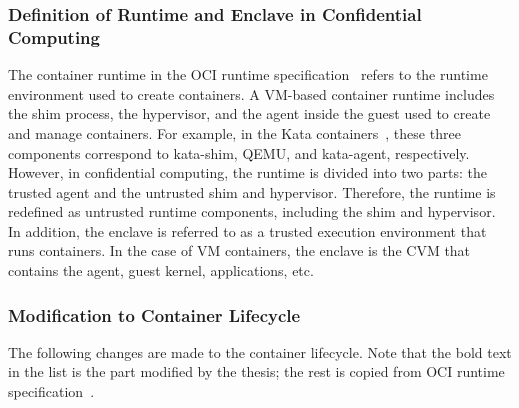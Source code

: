 \subsubsection{Definition of Runtime and Enclave in Confidential Computing}

The container runtime in the OCI runtime specification~\cite*{oci-runtime-spec} refers to the runtime environment used to create containers. A VM-based container runtime includes the shim process, the hypervisor, and the agent inside the guest used to create and manage containers. 
For example, in the Kata containers~\cite*{Kata-Containers}, these three components correspond to kata-shim, QEMU, and kata-agent, respectively. However, in confidential computing, the runtime is divided into two parts: the trusted agent and the untrusted shim and hypervisor. Therefore, the runtime is redefined
as untrusted runtime components, including the shim and hypervisor. In addition, the enclave is referred to as a trusted execution environment that runs containers. In the case of VM containers, the enclave is the  CVM that contains the agent, guest kernel, applications, etc.

\subsubsection{Modification to Container Lifecycle}
The following changes are made to the container lifecycle. Note that the bold text in the list is the part modified by the thesis; the rest is copied from OCI runtime specification~\cite*{oci-runtime-spec}.

